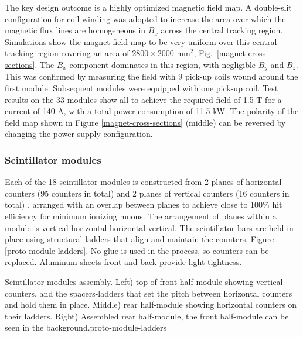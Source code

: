 The key design outcome is a highly optimized magnetic field map. A double-slit configuration for coil winding was adopted to increase the area over which the magnetic flux lines are homogeneous in $B_x$ across the central tracking region. Simulations show the magnet field map to be very uniform over this central tracking region covering an area of $2800\times2000$ mm$^2$, Fig.~\ref{magnet-cross-sections}. The $B_x$ component dominates in this region, with negligible $B_y$ and $B_z$. This was confirmed by measuring the field with 9 pick-up coils wound around the first module. Subsequent modules were equipped with one pick-up coil. Test results on the 33 modules show all to achieve the required field of 1.5 T for a current of 140 A, with a total power consumption of 11.5 kW. The polarity of the field map shown in Figure \ref{magnet-cross-sections} (middle) can be reversed by changing the power supply configuration.

\subsubsection{Scintillator modules}
Each of the 18 scintillator modules is constructed from 2 planes of horizontal counters (95 counters in total) and 2 planes of vertical counters (16 counters in total) \cite{Antonova:2017tuf}, arranged with an overlap between planes to achieve close to 100\% hit efficiency for minimum ionizing muons. The arrangement of planes within a module is vertical-horizontal-horizontal-vertical.
The scintillator bars are held in place using structural ladders that align and maintain the counters, Figure \ref{proto-module-ladders}. No glue is used in the process, so counters can be replaced. Aluminum sheets front and back provide light tightness.

 {Scintillator modules assembly. Left) top of front half-module showing vertical counters, and the spacers-ladders that set the pitch between horizontal counters and hold them in place. Middle) rear half-module showing horizontal counters on their ladders. Right) Assembled rear half-module, the front half-module can be seen in the background.}{proto-module-ladders}

